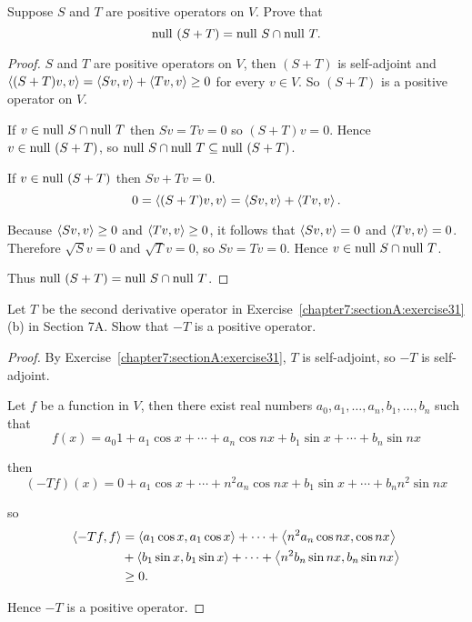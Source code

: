 \newpage

\begin{exercise}
    Suppose $S$ and $T$ are positive operators on $V$. Prove that
    \[
        \operatorname{null}\,{(S + T)} = \operatorname{null}\,{S}\cap\operatorname{null}\,{T}.
    \]
\end{exercise}

\begin{proof}
    $S$ and $T$ are positive operators on $V$, then $(S + T)$ is self-adjoint and $\left\langle{(S + T)v, v}\right\rangle = \left\langle{Sv, v}\right\rangle + \left\langle{Tv, v}\right\rangle\geq 0$ for every $v\in V$. So $(S + T)$ is a positive operator on $V$.

    If $v\in \operatorname{null}\,{S}\cap \operatorname{null}\,{T}$ then $Sv = Tv = 0$ so $(S + T)v = 0$. Hence $v\in \operatorname{null}\,{(S + T)}$, so $\operatorname{null}\,{S}\cap\operatorname{null}\,{T}\subseteq \operatorname{null}\,{(S + T)}$.

    If $v\in \operatorname{null}\,{(S + T)}$ then $Sv + Tv = 0$.
    \[
        0 = \left\langle{(S + T)v, v}\right\rangle = \left\langle{Sv, v}\right\rangle + \left\langle{Tv, v}\right\rangle.
    \]

    Because $\left\langle{Sv, v}\right\rangle\geq 0$ and $\left\langle{Tv, v}\right\rangle\geq 0$, it follows that $\left\langle{Sv, v}\right\rangle = 0$ and $\left\langle{Tv, v}\right\rangle = 0$. Therefore $\sqrt{S}v = 0$ and $\sqrt{T}v = 0$, so $Sv = Tv = 0$. Hence $v\in \operatorname{null}\,{S}\cap\operatorname{null}\,{T}$.

    Thus $\operatorname{null}\,{(S + T)} = \operatorname{null}\,{S}\cap\operatorname{null}\,{T}$.
\end{proof}
\newpage

\begin{exercise}
    Let $T$ be the second derivative operator in Exercise~\ref{chapter7:sectionA:exercise31}{(b)} in Section 7A. Show that $-T$ is a positive operator.
\end{exercise}

\begin{proof}
    By Exercise~\ref{chapter7:sectionA:exercise31}, $T$ is self-adjoint, so $-T$ is self-adjoint.

    Let $f$ be a function in $V$, then there exist real numbers $a_{0}, a_{1}, \ldots, a_{n}, b_{1}, \ldots, b_{n}$ such that
    \[
        f(x) = a_{0}1 + a_{1}\cos x + \cdots + a_{n}\cos nx + b_{1}\sin x + \cdots + b_{n}\sin nx
    \]

    then
    \[
        (-Tf)(x) = 0 + a_{1}\cos x + \cdots + n^{2}a_{n}\cos nx + b_{1}\sin x + \cdots + b_{n}n^{2}\sin nx
    \]

    so
    \begin{align*}
        \left\langle{-Tf, f}\right\rangle & = \left\langle{a_{1}\cos x, a_{1}\cos x}\right\rangle + \cdots + \left\langle{n^{2}a_{n}\cos nx, \cos nx}\right\rangle      \\
                           & + \left\langle{b_{1}\sin x, b_{1}\sin x}\right\rangle + \cdots + \left\langle{n^{2}b_{n}\sin nx, b_{n}\sin nx}\right\rangle \\
                           & \geq 0.
    \end{align*}

    Hence $-T$ is a positive operator.
\end{proof}
\newpage

